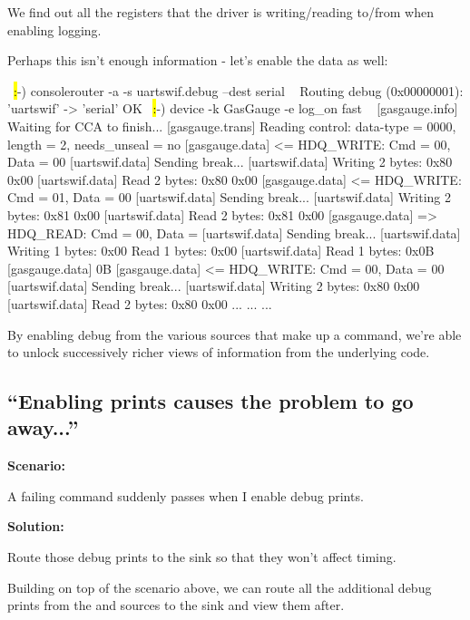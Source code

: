 We find out all the registers that the driver is writing/reading to/from when enabling logging.

Perhaps this isn't enough information - let's enable the  data as well:

\begin{LuaCode}
~\hl:-) consolerouter -a -s uartswif.debug --dest serial ~
Routing debug (0x00000001): 'uartswif' -> 'serial'
OK
~\hl:-) device -k GasGauge -e log\_on fast ~
[gasgauge.info] Waiting for CCA to finish...
[gasgauge.trans] Reading control: data-type = 0000, length = 2, needs_unseal = no
[gasgauge.data] <= HDQ_WRITE: Cmd = 00, Data = 00
[uartswif.data] Sending break...
[uartswif.data] Writing 2 bytes: 0x80 0x00
[uartswif.data] Read 2 bytes: 0x80 0x00 
[gasgauge.data] <= HDQ_WRITE: Cmd = 01, Data = 00
[uartswif.data] Sending break...
[uartswif.data] Writing 2 bytes: 0x81 0x00
[uartswif.data] Read 2 bytes: 0x81 0x00 
[gasgauge.data] => HDQ_READ: Cmd = 00, Data = 
[uartswif.data] Sending break...
[uartswif.data] Writing 1 bytes: 0x00 Read 1 bytes: 0x00 
[uartswif.data] Read 1 bytes: 0x0B 
[gasgauge.data] 0B
[gasgauge.data] <= HDQ_WRITE: Cmd = 00, Data = 00
[uartswif.data] Sending break...
[uartswif.data] Writing 2 bytes: 0x80 0x00
[uartswif.data] Read 2 bytes: 0x80 0x00 
...
...
...
\end{LuaCode}

By enabling debug from the various sources that make up a command, we're able to unlock successively richer views of information 
from the underlying code. 


\subsection{``Enabling prints causes the problem to go away...''}

\bfseries Scenario: \mdseries\par
A failing command suddenly passes when I enable debug prints. 

\bfseries Solution: \mdseries\par
Route those debug prints to the  sink so that they won't affect timing. 

Building on top of the scenario above, we can route all the additional debug prints from the  and  
sources to the  sink and view them after. 

